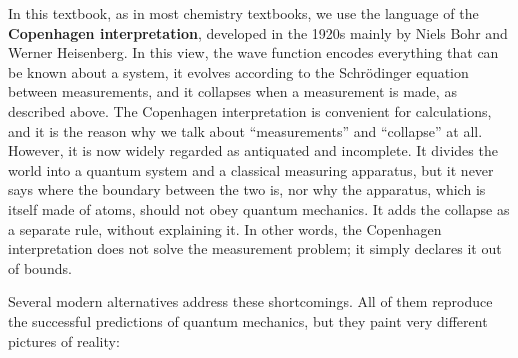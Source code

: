 \documentclass[
  english,
  9pt,
]{extbook}
\theoremstyle{definition}
\theoremstyle{definition}
\theoremstyle{definition}
\theoremstyle{definition}
\theoremstyle{remark}
\begin{document}
In this textbook, as in most chemistry textbooks, we use the language of the \textbf{Copenhagen interpretation}, developed in the 1920s mainly by Niels Bohr and Werner Heisenberg. In this view, the wave function encodes everything that can be known about a system, it evolves according to the Schrödinger equation between measurements, and it collapses when a measurement is made, as described above. The Copenhagen interpretation is convenient for calculations, and it is the reason why we talk about ``measurements'' and ``collapse'' at all. However, it is now widely regarded as antiquated and incomplete. It divides the world into a quantum system and a classical measuring apparatus, but it never says where the boundary between the two is, nor why the apparatus, which is itself made of atoms, should not obey quantum mechanics. It adds the collapse as a separate rule, without explaining it. In other words, the Copenhagen interpretation does not solve the measurement problem; it simply declares it out of bounds.

Several modern alternatives address these shortcomings. All of them reproduce the successful predictions of quantum mechanics, but they paint very different pictures of reality:
\end{document}
